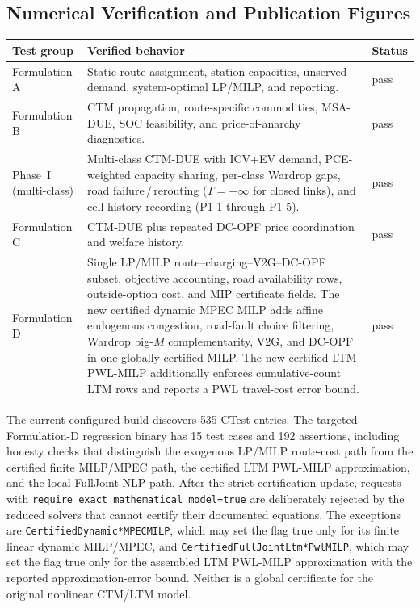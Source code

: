 \subsection{Numerical Verification and Publication Figures}
\label{sec:evpt-numerical-verification}

\begin{center}
\small
\begin{tabularx}{\textwidth}{L{0.13\textwidth}X L{0.16\textwidth}}
\toprule
\textbf{Test group} & \textbf{Verified behavior} & \textbf{Status} \\
\midrule
Formulation A & Static route assignment, station capacities, unserved demand,
system-optimal LP/MILP, and reporting. & pass \\
Formulation B & CTM propagation, route-specific commodities, MSA-DUE,
SOC feasibility, and price-of-anarchy diagnostics. & pass \\
Phase~I (multi-class) & Multi-class CTM-DUE with ICV+EV demand, PCE-weighted
capacity sharing, per-class Wardrop gaps, road failure\,/\,rerouting
(\(T=+\infty\) for closed links), and cell-history recording
(P1-1 through P1-5). & pass \\
Formulation C & CTM-DUE plus repeated DC-OPF price coordination and welfare
history. & pass \\
Formulation D & Single LP/MILP route--charging--V2G--DC-OPF subset,
objective accounting, road availability rows, outside-option cost, and MIP
certificate fields.  The new certified dynamic MPEC MILP adds affine
endogenous congestion, road-fault choice filtering, Wardrop big-\(M\)
complementarity, V2G, and DC-OPF in one globally certified MILP.  The
new certified LTM PWL-MILP additionally enforces cumulative-count LTM rows
and reports a PWL travel-cost error bound. & pass \\
\bottomrule
\end{tabularx}
\end{center}

The current configured build discovers 535 CTest entries.  The targeted
Formulation-D regression binary has 15 test cases and 192 assertions, including
honesty checks that distinguish the exogenous LP/MILP route-cost path from the
certified finite MILP/MPEC path, the certified LTM PWL-MILP approximation, and
the local FullJoint NLP path.
After the strict-certification update, requests with
\texttt{require\_exact\_mathematical\_model=true} are deliberately rejected by
the reduced solvers that cannot certify their documented equations.  The
exceptions are \texttt{CertifiedDynamic*MPECMILP}, which may set the flag true
only for its finite linear dynamic MILP/MPEC, and
\texttt{CertifiedFullJointLtm*PwlMILP}, which may set the flag true only for
the assembled LTM PWL-MILP approximation with the reported approximation-error
bound.  Neither is a global certificate for the original nonlinear CTM/LTM
model.

